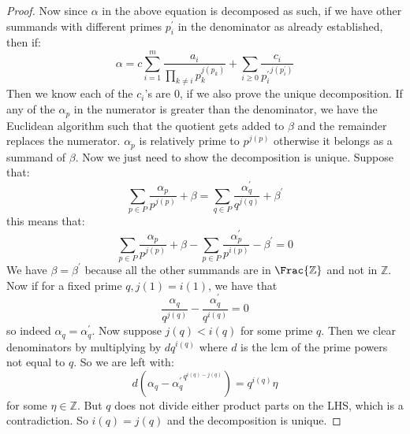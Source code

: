 \documentclass{article}
\begin{document}
\begin{itemize}
\begin{proof}
                Now since $\alpha$ in the above equation is decomposed as such, if we have other summands with different primes $p^{\prime}_{i}$ in the denominator as already established, then if: 
                    \begin{equation*}
                        \alpha = c\sum_{i = 1}^{m} \dfrac{a_{i}}{\prod_{k \neq i}p_{k}^{j(p_{k})}} + \sum_{i \geq 0} \dfrac{c_{i}}{{p^{\prime}_{i}}^{j(p^{\prime}_{i})}}
                    \end{equation*}
                Then we know each of the $c_{i}$'s are $0$, if we also prove the unique decomposition. If any of the $\alpha_{p}$ in the numerator is greater than the denominator, we have the Euclidean algorithm such that the quotient gets added to $\beta$ and the remainder replaces the numerator. $\alpha_{p}$ is relatively prime to $p^{j(p)}$ otherwise it belongs as a summand of $\beta$. Now we just need to show the decomposition is unique. Suppose that:
                    \begin{equation*}
                        \sum_{p \in P}\dfrac{\alpha_{p}}{p^{j(p)}} + \beta  = \sum_{q \in P} \dfrac{\alpha^{\prime}_{q}}{q^{j(q)}} + \beta^{\prime}
                    \end{equation*}
                this means that:
                    \begin{equation*}
                        \sum_{p \in P}\dfrac{\alpha_{p}}{p^{j(p)}} + \beta - \sum_{p \in P} \dfrac{\alpha^{\prime}_{p}}{p^{i(p)}} - \beta^{\prime} = 0
                    \end{equation*}
                We have $\beta = \beta^{\prime}$ because all the other summands are in $\Frac{\mathbb{Z}}$ and not in $\mathbb{Z}$. Now if for a fixed prime $q, j(1) = i(1)$, we have that 
                    \begin{equation*}
                        \dfrac{\alpha_{q}}{q^{j(q)}} - \dfrac{\alpha^{\prime}_{q}}{q^{i(q)}} = 0
                    \end{equation*}
                so indeed $\alpha_{q} = \alpha^{\prime}_{q}$. Now suppose $j(q) < i(q)$ for some prime $q$. Then we clear denominators by multiplying by $dq^{i(q)}$ where $d$ is the lcm of the prime powers not equal to $q$. So we are left with:
                    \begin{equation*}
                        d(\alpha_{q} - {\alpha^{\prime}_{q}}^{q^{i(q)  - j(q) }}) = q^{i(q)}\eta
                    \end{equation*}
                for some $\eta \in \mathbb{Z}$. But $q$ does not divide either product parts on the LHS, which is a contradiction. So $i(q) = j(q)$ and the decomposition is unique.
            \end{proof}


\end{itemize}
\end{document}
